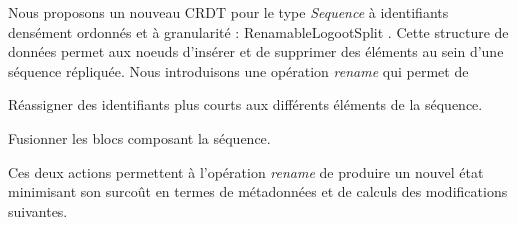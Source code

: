 Nous proposons un nouveau \ac{CRDT} pour le type \emph{Sequence} à identifiants densément ordonnés et à granularité : RenamableLogootSplit \cite{2020-rls-papoc-nicolas,2022-rls-tpds-nicolas}.
Cette structure de données permet aux noeuds d'insérer et de supprimer des éléments au sein d'une séquence répliquée.
Nous introduisons une opération \emph{rename} qui permet de
\begin{enumerate*}
  \item Réassigner des identifiants plus courts aux différents éléments de la séquence.
  \item Fusionner les blocs composant la séquence.
\end{enumerate*}
Ces deux actions permettent à l'opération \emph{rename} de produire un nouvel état minimisant son surcoût en termes de métadonnées et de calculs des modifications suivantes.
